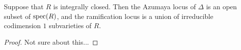 \begin{prop}
Suppose that $R$ is integrally closed.  Then the Azumaya locus of $\Delta$ is an open subset of $\textnormal{spec}(R)$, and the ramification locus is a union of irreducible codimension $1$ subvarieties of $R$.
\end{prop}
\begin{proof}
Not sure about this...
\end{proof}



\newpage



\endinput

